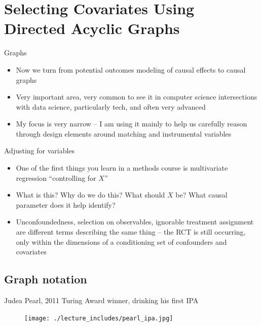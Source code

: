 \documentclass{beamer}
\begin{document}




\section{Selecting Covariates Using Directed Acyclic Graphs}

\begin{frame}{Graphs}

\begin{itemize}

\item Now we turn from potential outcomes modeling of causal effects to causal graphs
\item Very important area, very common to see it in computer science intersections with data science, particularly tech, and often very advanced
\item My focus is very narrow -- I am using it mainly to help us carefully reason through design elements around matching and instrumental variables

\end{itemize}

\end{frame}

\begin{frame}{Adjusting for variables}

\begin{itemize}
\item One of the first things you learn in a methods course is multivariate regression ``controlling for $X$''
\item What is this? Why do we do this?  What should $X$ be? What causal parameter does it help identify?
\item Unconfoundedness, selection on observables, ignorable treatment assignment are different terms describing the same thing -- the RCT is still occurring, only within the dimensions of a conditioning set of confounders and covariates
\end{itemize}

\end{frame}


\subsection{Graph notation}

\begin{frame}{Judea Pearl, 2011 Turing Award winner, drinking his first IPA}

  \begin{figure}
    \texttt{[image: ./lecture\_includes/pearl\_ipa.jpg]}
  \end{figure}

\end{frame}
\end{document}
